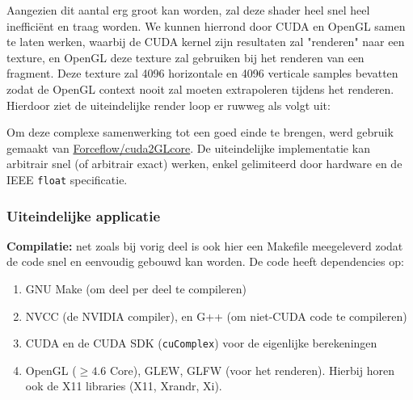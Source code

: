\documentclass{article}
\begin{document}
Aangezien dit aantal erg groot kan worden, zal deze shader heel snel heel ineffici\"ent en traag worden. We kunnen hierrond door CUDA en OpenGL samen te laten werken, waarbij de CUDA kernel zijn resultaten zal "renderen" naar een texture, en OpenGL deze texture zal gebruiken bij het renderen van een fragment. Deze texture zal 4096 horizontale en 4096 verticale samples bevatten zodat de OpenGL context nooit zal moeten extrapoleren tijdens het renderen. Hierdoor ziet de uiteindelijke render loop er ruwweg als volgt uit: \\

\begin{algorithm}[H]
 \;
 \;
\end{algorithm}

Om deze complexe samenwerking tot een goed einde te brengen, werd gebruik gemaakt van \href{https://github.com/Forceflow/cuda2GLcore}{Forceflow/cuda2GLcore}. De uiteindelijke implementatie kan arbitrair snel (of arbitrair exact) werken, enkel gelimiteerd door hardware en de IEEE \verb|float| specificatie.

\subsubsection{Uiteindelijke applicatie}
\textbf{Compilatie:} net zoals bij vorig deel is ook hier een Makefile meegeleverd zodat de code snel en eenvoudig gebouwd kan worden. De code heeft dependencies op:
\begin{enumerate}
 \item GNU Make (om deel per deel te compileren)
 \item NVCC (de NVIDIA compiler), en G++ (om niet-CUDA code te compileren)
 \item CUDA en de CUDA SDK (\verb|cuComplex|) voor de eigenlijke berekeningen
 \item OpenGL ($\geq 4.6$ Core), GLEW, GLFW (voor het renderen). Hierbij horen ook de X11 libraries (X11, Xrandr, Xi).
\end{enumerate}
\end{document}
